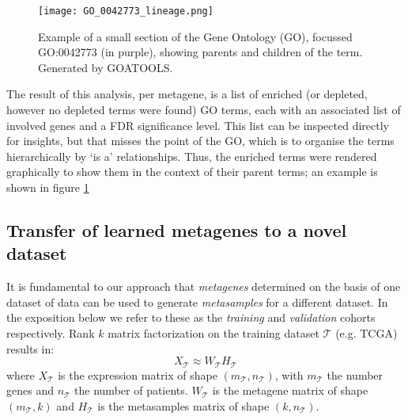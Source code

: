 \documentclass[tikz, 12pt,a4paper,oneside,fleqn]{article}
\begin{document}
\begin{figure}[htb!]
\begin{center}
\texttt{[image: GO\_0042773\_lineage.png]}
\caption{Example of a small section of the Gene Ontology (GO), focussed GO:0042773 (in purple), showing parents and children of the term.   Generated by GOATOOLS.}
\label{fig-eg_go_graphic}
\end{center}
\end{figure}

The result of this analysis, per metagene, is a list of enriched (or depleted, however no depleted terms were found) GO terms, each with an associated list of involved genes and a FDR significance level.   This list can be inspected directly for insights, but that misses the point of the GO, which is to organise the terms hierarchically by `is a' relationships.   Thus, the enriched terms were rendered graphically to show them in the context of their parent terms; an example is shown in figure \ref{fig-eg_go_graphic}


\subsection{Transfer of learned metagenes to a novel dataset}
\label{sec-transfer-to-novel}

\newcommand{\trainset}{\mathcal{T}}
\newcommand{\validset}{\mathcal{V}}

It is fundamental to our approach that \emph{metagenes} determined on the basis of one dataset of data can be used to generate \emph{metasamples} for a different dataset.  In the exposition below we refer to these as the \emph{training} and \emph{validation} cohorts respectively.
Rank $k$ matrix factorization on the training dataset $\trainset$ (e.g. TCGA) results in:
\begin{equation}
 X_\trainset \approx W_\trainset H_\trainset
\end{equation}
where $X_\trainset$ is the expression matrix of shape $(m_\trainset, n_\trainset)$, with $m_\trainset$ the number genes and $n_\trainset$ the number of patients. $W_\trainset$ is the metagene matrix of shape $(m_\trainset, k)$ and $H_\trainset$ is the metasamples matrix of shape $(k, n_\trainset)$.
\end{document}
